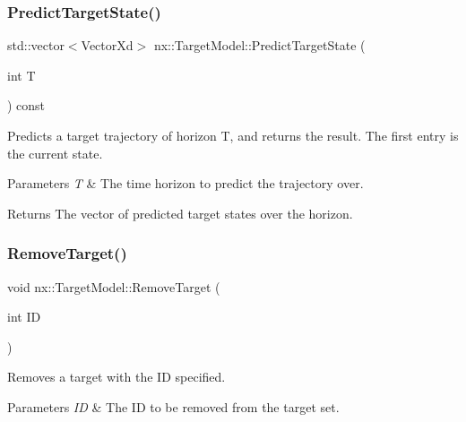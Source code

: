 \subsubsection{\texorpdfstring{Predict\+Target\+State()}{PredictTargetState()}}
{\footnotesize\ttfamily std\+::vector$<$Vector\+Xd$>$ nx\+::\+Target\+Model\+::\+Predict\+Target\+State (\begin{DoxyParamCaption}\item[{int}]{T }\end{DoxyParamCaption}) const\hspace{0.3cm}{\ttfamily [inline]}}

Predicts a target trajectory of horizon T, and returns the result. The first entry is the current state. 
\begin{DoxyParams}{Parameters}
{\em T} & The time horizon to predict the trajectory over. \\
\hline
\end{DoxyParams}
\begin{DoxyReturn}{Returns}
The vector of predicted target states over the horizon. 
\end{DoxyReturn}
\mbox{\label{classnx_1_1TargetModel_ad89e37efd10097f7c2d97f79ab380919}} 
\subsubsection{\texorpdfstring{Remove\+Target()}{RemoveTarget()}}
{\footnotesize\ttfamily void nx\+::\+Target\+Model\+::\+Remove\+Target (\begin{DoxyParamCaption}\item[{int}]{ID }\end{DoxyParamCaption})\hspace{0.3cm}{\ttfamily [inline]}}

Removes a target with the ID specified. 
\begin{DoxyParams}{Parameters}
{\em ID} & The ID to be removed from the target set. \\
\hline
\end{DoxyParams}
\mbox{\label{classnx_1_1TargetModel_ab170163096edacbfc2fc4e697f9cf139}} 
